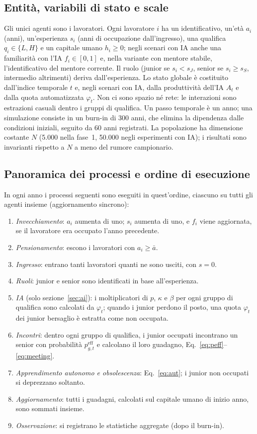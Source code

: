 \documentclass[preprint,12pt,authoryear]{elsarticle}
\begin{document}
\subsection{Entità, variabili di stato e scale}
Gli unici agenti sono i lavoratori. Ogni lavoratore $i$ ha un identificativo, un'età $a_i$ (anni), un'esperienza $s_i$ (anni di occupazione dall'ingresso), una qualifica $q_i\in\{L,H\}$ e un capitale umano $h_i\ge 0$; negli scenari con IA anche una familiarità con l'IA $f_i\in[0,1]$ e, nella variante con mentore stabile, l'identificativo del mentore corrente. Il ruolo (junior se $s_i<s_J$, senior se $s_i\ge s_S$, intermedio altrimenti) deriva dall'esperienza. Lo stato globale è costituito dall'indice temporale $t$ e, negli scenari con IA, dalla produttività dell'IA $A_t$ e dalla quota automatizzata $\varphi_t$. Non ci sono spazio né rete: le interazioni sono estrazioni casuali dentro i gruppi di qualifica. Un passo temporale è un anno; una simulazione consiste in un burn-in di 300 anni, che elimina la dipendenza dalle condizioni iniziali, seguito da 60 anni registrati. La popolazione ha dimensione costante $N$ (5.000 nella fase~1, 50.000 negli esperimenti con IA); i risultati sono invarianti rispetto a $N$ a meno del rumore campionario.

\subsection{Panoramica dei processi e ordine di esecuzione}
In ogni anno i processi seguenti sono eseguiti in quest'ordine, ciascuno su tutti gli agenti insieme (aggiornamento sincrono):
\begin{enumerate}
\item \emph{Invecchiamento}: $a_i$ aumenta di uno; $s_i$ aumenta di uno, e $f_i$ viene aggiornata, se il lavoratore era occupato l'anno precedente.
\item \emph{Pensionamento}: escono i lavoratori con $a_i\ge\bar a$.
\item \emph{Ingresso}: entrano tanti lavoratori quanti ne sono usciti, con $s=0$.
\item \emph{Ruoli}: junior e senior sono identificati in base all'esperienza.
\item \emph{IA} (solo sezione~\ref{sec:ai}): i moltiplicatori di $p$, $\kappa$ e $\beta$ per ogni gruppo di qualifica sono calcolati da $\varphi_t$; quando i junior perdono il posto, una quota $\varphi_t$ dei junior bersaglio è estratta come non occupata.
\item \emph{Incontri}: dentro ogni gruppo di qualifica, i junior occupati incontrano un senior con probabilità $p^{\mathrm{eff}}_{g,t}$ e calcolano il loro guadagno, Eq.~\eqref{eq:peff}--\eqref{eq:meeting}.
\item \emph{Apprendimento autonomo e obsolescenza}: Eq.~\eqref{eq:aut}; i junior non occupati si deprezzano soltanto.
\item \emph{Aggiornamento}: tutti i guadagni, calcolati sul capitale umano di inizio anno, sono sommati insieme.
\item \emph{Osservazione}: si registrano le statistiche aggregate (dopo il burn-in).
\end{enumerate}
\end{document}
